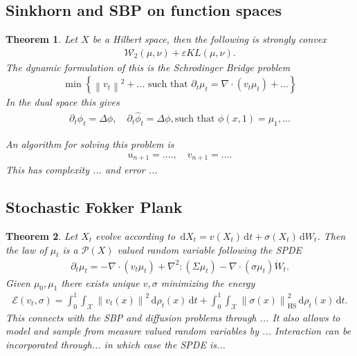\documentclass[
    a4paper,
    DIV=14,
    abstract=true,
    numbers=noenddot
]
{scrartcl}
\newtheorem{theorem}{Theorem}[section]
\theoremstyle{definition}
\newcommand{\eps}{\varepsilon}
\newcommand{\wh}[1]{\widehat{#1}}
\newcommand{\set}[1]{\left\{#1\right\}}
\renewcommand{\norm}[1]{\left\lVert #1 \right\rVert}\renewcommand{\abs}[1]{\left| #1 \right|}
\renewcommand{\d}{\,\mathrm{d}}\newcommand{\dx}{\,\mathrm{d}x}
\newcommand{\rmm}[1]{\mathrm{#1}}
\newcommand{\Pp}{\mathcal{P}}
\newcommand{\Ww}{\mathcal{W}}
\newcommand{\Xx}{\mathcal{X}}
\begin{document}
\subsection{Sinkhorn and SBP on function spaces}
\begin{theorem}
Let $X$ be a Hilbert space, then the following is strongly convex
\begin{align*}
    \Ww_2(\mu , \nu ) + \eps KL (\mu , \nu ).
\end{align*}
The dynamic formulation of this is the Schrodinger Bridge problem
\begin{align*}
   \min\set{\norm{v_t}^2+...  \text{ such that }  \partial _t \mu _t = \nabla \cdot (v_t \mu _t)+...}
\end{align*}
In the dual space this gives 
\begin{align*}
\partial _t \phi _t = \Delta \phi , \quad \partial _t \wh{\phi }_t = \Delta \phi , \text{such that } \phi(x,1)= \mu_1,   ...
\end{align*}


An algorithm for solving this problem is 
\begin{align*}
    u_{n+1}= .... , \quad v_{n+1} = ....
\end{align*}
This has complexity ... and error ...
\end{theorem}
\subsection{Stochastic Fokker Plank}
\begin{theorem}
Let $X_t$ evolve according to $\d X_t = v(X_t)\d t+ \sigma (X_t) \d W_t$. Then the law of $\mu_t$ is a $\Pp(X)$ valued random variable  following the SPDE
\begin{align}\label{stochastic evolution PDE}
    \partial_t \mu_t = - \nabla \cdot (v_t\mu_t) + \nabla^2\colon(\Sigma \mu_t) - \nabla \cdot (\sigma\mu_t )\dot{W}_t.
\end{align}
Given $\mu _0, \mu _1$ there exists unique $v, \sigma $ minimizing the energy    
\begin{align*}
  \mathcal{E}(v_t, \sigma)=  \int_{0}^1 \int_{\Xx} \norm{v_t(x)}^2 \d \rho_t(x)\d t+\int_{0}^1 \int_{\Xx} \norm{\sigma(x)}^2_{\rmm{HS}} \d \rho_t(x)\d t.
\end{align*}
This connects with the SBP and diffusion problems through ... It also allows to model and sample from measure valued random variables by ... Interaction can be incorporated through... in which case the SPDE is...
\end{theorem}
\end{document}
